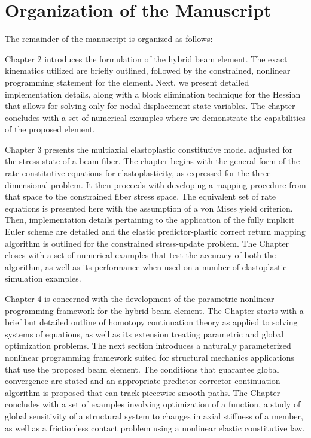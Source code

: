 \section{Organization of the Manuscript}
The remainder of the manuscript is organized as follows: 

Chapter 2 introduces the formulation of the hybrid beam element. The exact kinematics 
utilized are briefly outlined, followed by the constrained, nonlinear programming 
statement for the element. Next, we present detailed implementation details, along 
with a block elimination technique for the Hessian that allows for solving only for 
nodal displacement state variables. The chapter concludes with a set of numerical 
examples where we demonstrate the capabilities of the proposed element.

Chapter 3 presents the multiaxial elastoplastic constitutive model adjusted for the 
stress state of a beam fiber. The chapter begins with the general form of the rate 
constitutive equations for elastoplasticity, as expressed for the three-dimensional 
problem. It then proceeds with developing a mapping procedure from that space to the 
constrained fiber stress space. The equivalent set of rate equations is presented here 
with the assumption of a von Mises yield criterion. Then, implementation details 
pertaining to the application of the fully implicit Euler scheme are detailed and the 
elastic predictor-plastic correct return mapping algorithm is outlined for the 
constrained stress-update problem. The Chapter closes with a set of numerical examples 
that test the accuracy of both the algorithm, as well as its performance when used on 
a number of elastoplastic simulation examples.

Chapter 4 is concerned with the development of the parametric nonlinear programming 
framework for the hybrid beam element. The Chapter starts with a brief but detailed 
outline of homotopy continuation theory as applied to solving systems of equations, as 
well as its extension treating parametric and global optimization problems. The 
next 
section introduces a naturally parameterized nonlinear programming framework 
suited 
for structural mechanics applications that use the proposed beam element. The 
conditions that guarantee global convergence are stated and an appropriate 
predictor-corrector continuation algorithm is proposed that can track piecewise smooth 
paths. The Chapter concludes with a set of examples involving optimization of a 
function, a study of global sensitivity of a structural system to changes in axial 
stiffness of a member, as well as a frictionless contact problem using a nonlinear 
elastic constitutive law.

